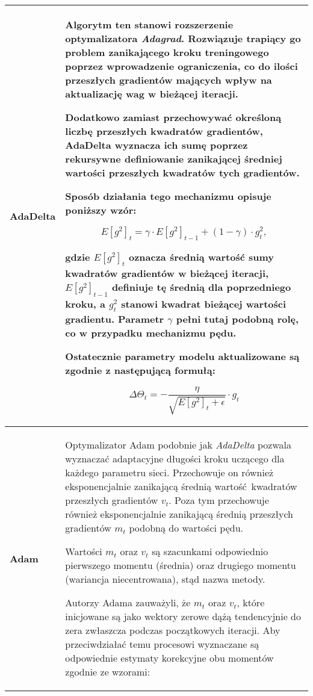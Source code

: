 \begin{enumerate}
\begin{longtable}{ |m{3cm}|m{10cm}| }
     \hline
       \textbf{AdaDelta \cite{Adadelta}} &

       Algorytm ten stanowi rozszerzenie optymalizatora \textit{Adagrad}. Rozwiązuje
       trapiący go problem zanikającego kroku treningowego poprzez wprowadzenie
       ograniczenia, co do ilości przeszłych gradientów mających wpływ na aktualizację
       wag w bieżącej iteracji.

       Dodatkowo zamiast przechowywać określoną liczbę przeszłych kwadratów gradientów,
       AdaDelta wyznacza ich sumę poprzez rekursywne definiowanie zanikającej
       średniej wartości przeszłych kwadratów tych gradientów.

       Sposób działania tego mechanizmu opisuje poniższy wzór:

       \[E[g^2]_t = \gamma \cdot E[g^2]_{t-1} + (1 - \gamma) \cdot g^2_t,\]

       gdzie $E[g^2]_t$ oznacza średnią wartość sumy kwadratów gradientów w bieżącej
       iteracji, $E[g^2]_{t-1}$ definiuje tę średnią dla poprzedniego kroku, a
       $g^2_t$ stanowi kwadrat bieżącej wartości gradientu. Parametr $\gamma$
       pełni tutaj podobną rolę, co w przypadku mechanizmu pędu.

       Ostatecznie parametry modelu aktualizowane są zgodnie z następującą formułą:

       \[\Delta \Theta_t = -\frac{\eta}{\sqrt{E[g^2]_t + \epsilon}} \cdot g_t\] \\

     \hline
       \textbf{Adam \cite{Adam}} &

       Optymalizator Adam podobnie jak \textit{AdaDelta} pozwala wyznaczać adaptacyjne długości
       kroku uczącego dla każdego parametru sieci. Przechowuje on również
       eksponencjalnie zanikającą średnią wartość kwadratów przeszłych gradientów $v_t$.
       Poza tym przechowuje również eksponencjalnie zanikającą średnią
       przeszłych gradientów $m_t$ podobną do wartości pędu.

       Wartości $m_t$ oraz $v_t$ są szacunkami odpowiednio pierwszego momentu
       (średnia) oraz drugiego momentu (wariancja niecentrowana), stąd nazwa metody.

       Autorzy Adama zauważyli, że $m_t$ oraz $v_t$, które inicjowane są jako
       wektory zerowe dążą tendencyjnie do zera zwłaszcza podczas początkowych
       iteracji. Aby przeciwdziałać temu procesowi wyznaczane są odpowiednie
       estymaty korekcyjne obu momentów zgodnie ze wzorami:


\end{longtable}
\end{enumerate}
